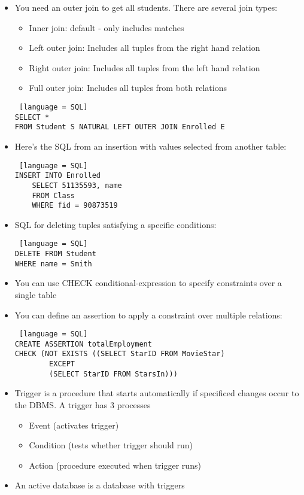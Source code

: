 \documentclass[8pt,landscape,a4paper, fleqn, dvipsnames]{extarticle}
\begin{document}
\begin{multicols*}{4}
\begin{itemize}
    \begin{lstlisting} [language = SQL]
SELECT *
FROM student s natural join enrolled e
    \end{lstlisting}
    \item You need an outer join to get all students. There are several join types:
    \begin{itemize}
        \item Inner join: default - only includes matches
        \item Left outer join: Includes all tuples from the right hand relation
        \item Right outer join: Includes all tuples from the left hand relation
        \item Full outer join: Includes all tuples from both relations
    \end{itemize}
    \begin{lstlisting} [language = SQL]
SELECT *
FROM Student S NATURAL LEFT OUTER JOIN Enrolled E
    \end{lstlisting}
    \item Here's the SQL from an insertion with values selected from another table:
    \begin{lstlisting} [language = SQL]
INSERT INTO Enrolled
    SELECT 51135593, name
    FROM Class
    WHERE fid = 90873519
    \end{lstlisting}
    \item SQL for deleting tuples satisfying a specific conditions:
    \begin{lstlisting} [language = SQL]
DELETE FROM Student
WHERE name = Smith
    \end{lstlisting}
    \item You can use CHECK conditional-expression to specify constraints over a single table
    \item You can define an assertion to apply a constraint over multiple relations:
    \begin{lstlisting} [language = SQL]
CREATE ASSERTION totalEmployment
CHECK (NOT EXISTS ((SELECT StarID FROM MovieStar)
        EXCEPT
        (SELECT StarID FROM StarsIn)))
    \end{lstlisting}
    \item Trigger is a procedure that starts automatically if specificed changes occur to the DBMS. A trigger has 3 processes
    \begin{itemize}
        \item Event (activates trigger)
        \item Condition (tests whether trigger should run)
        \item Action (procedure executed when trigger runs)
    \end{itemize}
    \item An active database is a database with triggers
\end{itemize}


\end{multicols*}
\end{document}

